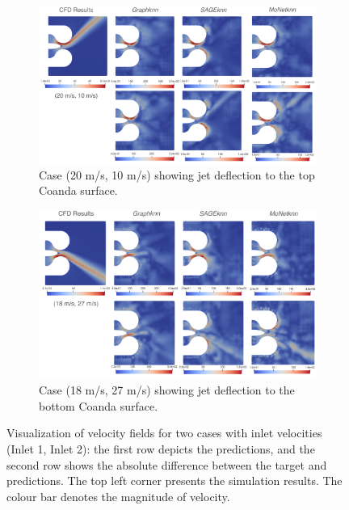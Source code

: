 \begin{figure}[ht]
    \centering
    \begin{subfigure}[b]{14cm}
        \centering
        \includegraphics[width=\textwidth]{images/Methodology/Asset 18.png}
        \caption{Case (20 m/s, 10 m/s) showing jet deflection to the top Coanda surface.}
        \label{fig:allvel1}
    \end{subfigure}
    \begin{subfigure}[b]{14cm}
        \centering
        \includegraphics[width=\textwidth]{images/Methodology/Asset 17.png}
        \caption{Case (18 m/s, 27 m/s) showing jet deflection to the bottom Coanda surface.}
        \label{fig:allvel2}
    \end{subfigure}
    \caption{Visualization of velocity fields for two cases with inlet velocities (Inlet 1, Inlet 2): the first row depicts the predictions, and the second row shows the absolute difference between the target and predictions. The top left corner presents the simulation results. The colour bar denotes the magnitude of velocity. }
    \label{2vel1}
\end{figure}
